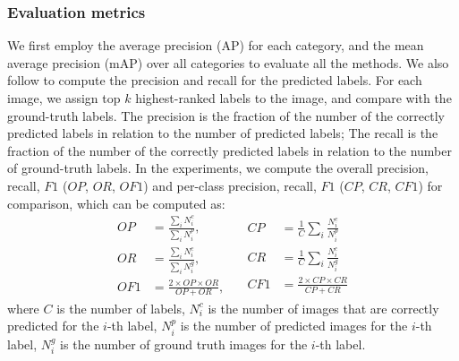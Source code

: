 \documentclass[letterpaper]{article} %
\begin{document}
\subsubsection{Evaluation metrics} 
We first employ the average precision (AP) for each category, and the mean average precision (mAP) over all categories to evaluate all the methods. We also follow \cite{gong2013deep,wang2016cnn} to compute the precision and recall for the predicted labels. For each image, we assign top $k$ highest-ranked labels to the image, and compare with the ground-truth labels. The precision is the fraction of the number of the correctly predicted labels in relation to the
number of predicted labels; The recall is the fraction of the number of the correctly predicted labels in relation to the number of ground-truth labels. In the experiments, we compute the overall precision, recall, $F1$ ($OP$, $OR$, $OF1$) and
per-class precision, recall, $F1$ ($CP$, $CR$, $CF1$) for comparison, which can be computed as: 
\begin{equation}
   \begin{split}
         OP&=\frac{\sum_{i}N_{i}^{c}}{\sum_{i}N_{i}^{p}},\quad\\
         OR&=\frac{\sum_{i}N_{i}^{c}}{\sum_{i}N_{i}^{g}},\quad\\
         OF1&=\frac{2 \times OP \times OR}{OP+OR},\quad 
   \end{split}
      \begin{split}
         CP&=\frac{1}{C}\sum_{i}\frac{N_{i}^{c}}{N_{i}^{p}}\\
         CR&=\frac{1}{C}\sum_{i}\frac{N_{i}^{c}}{N_{i}^{g}}\\
         CF1&=\frac{2 \times CP \times CR}{CP+CR}
   \end{split}
   \label{eqn:metric}
\end{equation}
where $C$ is the number of labels, $N_{i}^{c}$ is the number of images that are correctly predicted for the $i$-th label, $N_{i}^{p}$ is the number of predicted images for the $i$-th label, $N_{i}^{g}$ is the number of ground truth images for the $i$-th label.
\end{document}
